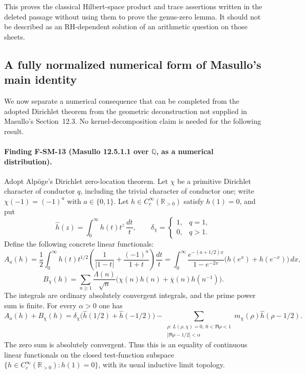 \documentclass[11pt,a4paper]{article}
\theoremstyle{definition}\newtheorem{definition}[theorem]{Definition}
\theoremstyle{remark}\newtheorem{remark}[theorem]{Remark}
\begin{document}
This proves the classical Hilbert-space product and trace assertions
written in the deleted passage without using them to prove the
genus-zero lemma.  It should not be described as an RH-dependent solution
of an arithmetic question on those sheets.

\subsection{A fully normalized numerical form of Masullo's main identity}

We now separate a numerical consequence that can be completed from the
adopted Dirichlet theorem from the geometric deconstruction not supplied
in Masullo's Section~12.3.  No kernel-decomposition claim is needed for
the following result.

\paragraph{Finding F-SM-13 (Masullo 12.5.1.1 over $\mathbb Q$, as a numerical distribution).}
Adopt Alp\"oge's Dirichlet zero-location theorem.  Let $\chi$ be a
primitive Dirichlet character of conductor $q$, including the trivial
character of conductor one; write $\chi(-1)=(-1)^a$ with $a\in\{0,1\}$.
Let $h\in C_c^\infty(\mathbb R_{>0})$ satisfy $h(1)=0$, and put
\[
 \widehat h(z)=\int_0^\infty h(t)t^z\,\frac{dt}{t},
 \qquad\delta_\chi=\begin{cases}1,&q=1,\\0,&q>1.\end{cases}
\]
Define the following concrete linear functionals:
\[
 A_a(h)=\frac12\int_0^\infty h(t)t^{1/2}
 \left(\frac1{|1-t|}+\frac{(-1)^a}{1+t}\right)\frac{dt}{t}
 =\int_0^\infty
 \frac{e^{-(a+1/2)x}}{1-e^{-2x}}
 \bigl(h(e^x)+h(e^{-x})\bigr)\,dx,
\]
\[
 B_\chi(h)=\sum_{n\geq1}\frac{\Lambda(n)}{\sqrt n}
 \bigl(\chi(n)h(n)+\overline\chi(n)h(n^{-1})\bigr).
\]
The integrals are ordinary absolutely convergent integrals, and the prime
power sum is finite.  For every $\alpha>0$ one has
\begin{equation}\label{eq:SM-numeric-strip}
 A_a(h)+B_\chi(h)
 =\delta_\chi\bigl(\widehat h(1/2)+\widehat h(-1/2)\bigr)
 -\!\sum_{\substack{\rho:\,L(\rho,\chi)=0,\ 0<\Re\rho<1\\
                         |\Re\rho-1/2|<\alpha}}
       m_\chi(\rho)\widehat h(\rho-1/2).
\end{equation}
The zero sum is absolutely convergent.  Thus this is an equality of
continuous linear functionals on the closed test-function subspace
$\{h\in C_c^\infty(\mathbb R_{>0}):h(1)=0\}$, with its usual inductive
limit topology.
\end{document}
